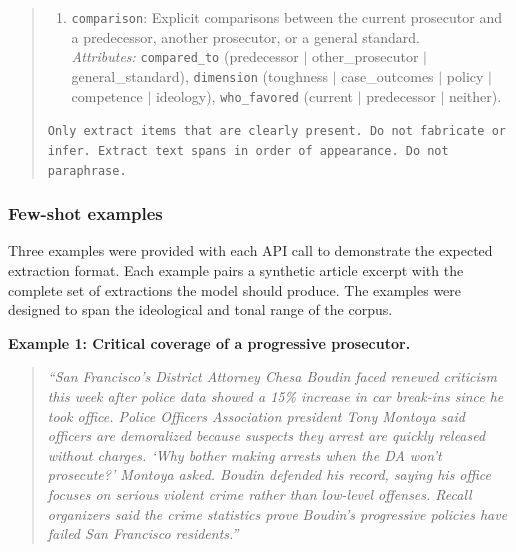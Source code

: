 \documentclass[12pt, letterpaper]{article}
\begin{document}
\begin{appendices}
\begin{quote}
\begin{enumerate}[leftmargin=*]
\item \texttt{comparison}: Explicit comparisons between the current prosecutor and a predecessor, another prosecutor, or a general standard.\\
\emph{Attributes:} \texttt{compared\_to} (predecessor $|$ other\_prosecutor $|$ general\_standard), \texttt{dimension} (toughness $|$ case\_outcomes $|$ policy $|$ competence $|$ ideology), \texttt{who\_favored} (current $|$ predecessor $|$ neither).
\end{enumerate}

\texttt{Only extract items that are clearly present. Do not fabricate or infer. Extract text spans in order of appearance. Do not paraphrase.}
\end{quote}

\subsubsection*{Few-shot examples}

Three examples were provided with each API call to demonstrate the expected extraction format. Each example pairs a synthetic article excerpt with the complete set of extractions the model should produce. The examples were designed to span the ideological and tonal range of the corpus.

\smallskip\noindent\textbf{Example 1: Critical coverage of a progressive prosecutor.}
\begin{quote}\small
\emph{``San Francisco's District Attorney Chesa Boudin faced renewed criticism this week after police data showed a 15\% increase in car break-ins since he took office. Police Officers Association president Tony Montoya said officers are demoralized because suspects they arrest are quickly released without charges. `Why bother making arrests when the DA won't prosecute?' Montoya asked. Boudin defended his record, saying his office focuses on serious violent crime rather than low-level offenses. Recall organizers said the crime statistics prove Boudin's progressive policies have failed San Francisco residents.''}
\end{quote}


\end{appendices}
\end{document}
